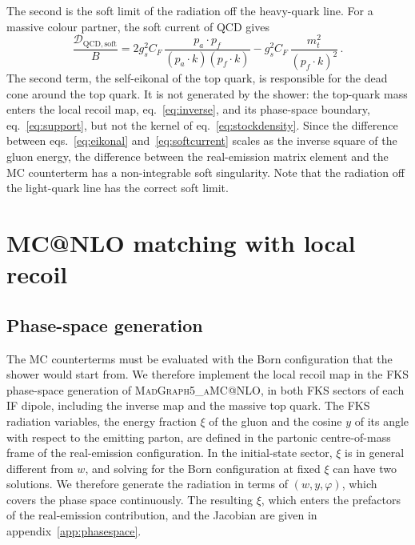 \documentclass[a4paper,11pt]{article}
\makeatletter
\newcommand{\mgamc}{\textsc{MadGraph5\_aMC@NLO}\xspace}
\newcommand{\Dens}{\mathcal{D}}
\makeatother
\begin{document}
The second is the soft limit of the radiation off the heavy-quark
line. For a massive colour partner, the soft current of QCD
gives~\cite{Catani:2002hc}
\begin{equation}
  \frac{\Dens_{\mathrm{QCD,soft}}}{B}
  =2g_s^2C_F\,\frac{p_a\cdot p_f}{(p_a\cdot k)(p_f\cdot k)}
  -g_s^2C_F\,\frac{m_t^2}{(p_f\cdot k)^2}\,.
  \label{eq:softcurrent}
\end{equation}
The second term, the self-eikonal of the top quark, is responsible for
the dead cone around the top quark. It is not generated by the shower:
the top-quark mass enters the local recoil map, eq.~\eqref{eq:inverse},
and its phase-space boundary, eq.~\eqref{eq:support}, but not the
kernel of eq.~\eqref{eq:stockdensity}. Since the difference between
eqs.~\eqref{eq:eikonal} and~\eqref{eq:softcurrent} scales as the inverse
square of the gluon energy, the difference between the real-emission
matrix element and the MC counterterm has a non-integrable soft
singularity. Note that the radiation off the light-quark line has the
correct soft limit.


\section{MC@NLO matching with local recoil}
\label{sec:matching}

\subsection{Phase-space generation}
\label{sec:phasespace}

The MC counterterms must be evaluated with the Born configuration that
the shower would start from. We therefore implement the local recoil
map in the FKS phase-space generation of \mgamc, in both FKS sectors
of each IF dipole, including the inverse map and the massive top quark.
The FKS radiation variables, the energy fraction $\xi$ of the gluon
and the cosine $y$ of its angle with respect to the emitting parton, are
defined in the partonic centre-of-mass frame of the real-emission
configuration. In the initial-state sector, $\xi$ is in general
different from $w$, and solving for the Born configuration at fixed
$\xi$ can have two solutions. We therefore generate the radiation in
terms of $(w,y,\varphi)$, which covers the phase space continuously.
The resulting $\xi$, which enters the prefactors of the real-emission
contribution, and the Jacobian are given in appendix~\ref{app:phasespace}.
\end{document}

